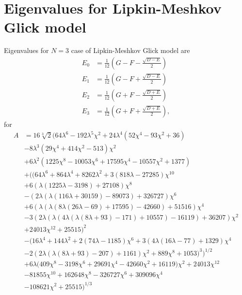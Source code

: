 \chapter{Eigenvalues for Lipkin-Meshkov Glick model}
\label{appendix1}
Eigenvalues for $N=3$ case of Lipkin-Meshkov Glick model are
\begin{align}
    E_0 &= \frac{1}{12} \left(G-F-\frac{\sqrt{D-E}}{2}\right)\\
    E_1 &= \frac{1}{12}  \left(G-F+\frac{\sqrt{D-E}}{2}\right)\\
    E_2 &= \frac{1}{12} \left(G+F-\frac{\sqrt{D+E}}{2}\right)\\
    E_3 &= \frac{1}{12}  \left(G+F+\frac{\sqrt{D+E}}{2}\right),
\end{align}
for
\begin{equation}
    \begin{split}
    A &= 16 \sqrt[3]{2} \Big(64 \lambda ^6-192 \lambda ^5 \chi ^2+24 \lambda ^4 \left(52 \chi ^4-93 \chi ^2+36\right)\\
    &-8 \lambda ^3 \left(29 \chi ^4+414 \chi ^2-513\right) \chi ^2
    \\
    &+6 \lambda ^2 \left(1225 \chi ^8-10053 \chi ^6+17595 \chi ^4-10557 \chi ^2+1377\right)\\
    &+\bigg(\big(64 \lambda ^6+864 \lambda ^4+8262 \lambda ^2+3 (818 \lambda -27285) \chi ^{10}\\
    &+6 (\lambda  (1225 \lambda -3198)+27108) \chi ^8\\
    &-(2 \lambda  (\lambda  (116 \lambda +30159)-89073)+326727) \chi ^6\\
    &+6 (\lambda  (\lambda  (8 \lambda  (26 \lambda -69)+17595)-42660)+51516) \chi ^4\\
    &-3 (2 \lambda  (\lambda  (4 \lambda  (\lambda  (8 \lambda +93)-171)+10557)-16119)+36207) \chi ^2\\
    &+24013 \chi ^{12}+25515\big)^2\\
    &-\big(16 \lambda ^4+144 \lambda ^2+2 (74 \lambda -1185) \chi ^6+3 (4 \lambda  (16 \lambda -77)+1329) \chi ^4\\
    &-2 (2 \lambda  (\lambda  (8 \lambda +93)-207)+1161) \chi ^2+889 \chi ^8+1053\big)^3\bigg)^{1/2}\\
    &+6 \lambda  \big(409 \chi ^8-3198 \chi ^6+29691 \chi ^4-42660 \chi ^2+16119\big) \chi ^2+24013 \chi ^{12}\\
    &-81855 \chi ^{10}+162648 \chi ^8-326727 \chi ^6+309096 \chi ^4\\
    &-108621 \chi ^2+25515\Big)^{1/3}
    \end{split}
\end{equation}

